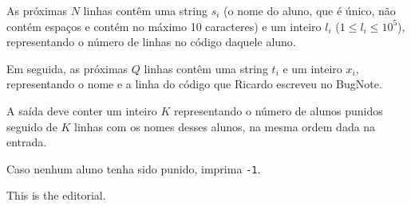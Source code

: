 As próximas $N$ linhas contêm uma string $s_i$ (o nome do aluno, que é único, não contém espaços e contém no máximo 10 caracteres) e um inteiro $l_i$ ($1 \leq l_i \leq 10^5$), representando o número de linhas no código daquele aluno.

Em seguida, as próximas $Q$ linhas contêm uma string $t_i$ e um inteiro $x_i$, representando o nome e a linha do código que Ricardo escreveu no BugNote.

A saída deve conter um inteiro $K$ representando o número de alunos punidos seguido de $K$ linhas com os nomes desses alunos, na mesma ordem dada na entrada.

Caso nenhum aluno tenha sido punido, imprima \texttt{-1}.

This is the editorial.
